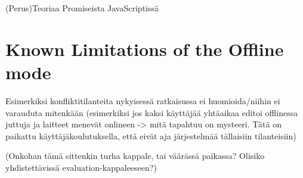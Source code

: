 (Perus)Teoriaa Promiseista JavaScriptissä






\section{Known Limitations of the Offline mode}
Esimerkiksi konfliktitilanteita nykyisessä ratkaisussa ei huomioida/niihin ei varauduta mitenkään (esimerkiksi jos kaksi käyttäjää yhtäaikaa editoi offlinessa juttuja ja laitteet menevät onlineen -> mitä tapahtuu on mysteeri. Tätä on paikattu käyttäjäkoulutuksella, että eivät aja järjestelmää tällaisiin tilanteisiin)


(Onkohan tämä sittenkin turha kappale, tai väärässä paikassa? Olisiko yhdistettävissä evaluation-kappaleeseen?)


